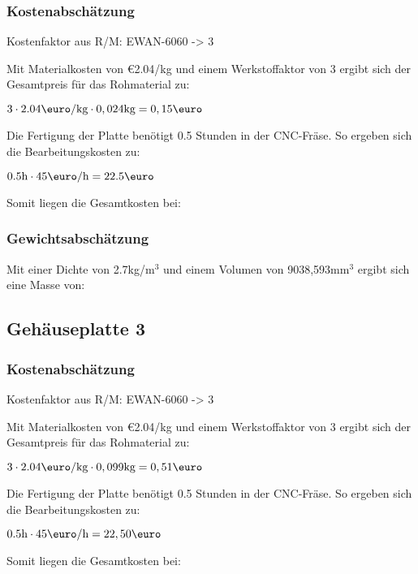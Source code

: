 \documentclass[10pt, a4paper]{article}
\begin{document}
\subsubsection{Kostenabschätzung}
\begin{center}
  Kostenfaktor aus R/M: EWAN-6060 -> 3
\end{center}
Mit Materialkosten von \euro2.04/kg und einem Werkstoffaktor von 3 ergibt sich der Gesamtpreis für das Rohmaterial zu: 
\begin{center}
    $3 \cdot 2.04\text{\euro/kg} \cdot 0,024\text{kg} = 0,15\text{\euro}$
\end{center}
Die Fertigung der Platte benötigt 0.5 Stunden in der CNC-Fräse. So ergeben sich die Bearbeitungskosten zu:
\begin{center}
  $0.5\text{h} \cdot 45\text{\euro/h}= 22.5\text{\euro}$
\end{center}
Somit liegen die Gesamtkosten bei:
\begin{flushright}
\end{flushright}
\subsubsection{Gewichtsabschätzung}
Mit einer Dichte von 2.7kg/m$^3$ und einem Volumen von 9038,593mm$^3$ ergibt sich eine Masse von:
\begin{flushright}
\end{flushright}

\newpage
\subsection{Gehäuseplatte 3}
\begin{figure}[h]
  \centering
  \vspace{-10pt}
\end{figure}
\subsubsection{Kostenabschätzung}
\begin{center}
  Kostenfaktor aus R/M: EWAN-6060 -> 3
\end{center}
Mit Materialkosten von \euro2.04/kg und einem Werkstoffaktor von 3 ergibt sich der Gesamtpreis für das Rohmaterial zu: 
\begin{center}
    $3 \cdot 2.04\text{\euro/kg} \cdot 0,099\text{kg} = 0,51\text{\euro}$
\end{center}
Die Fertigung der Platte benötigt 0.5 Stunden in der CNC-Fräse. So ergeben sich die Bearbeitungskosten zu:
\begin{center}
  $0.5\text{h} \cdot 45\text{\euro/h}= 22,50\text{\euro}$
\end{center}
Somit liegen die Gesamtkosten bei:
\begin{flushright}
\end{flushright}
\end{document}
